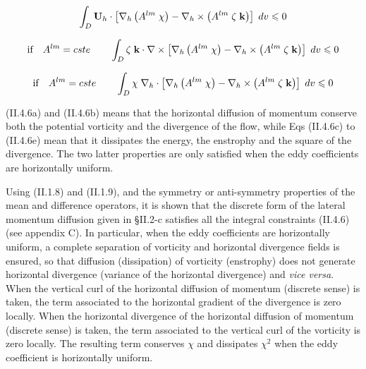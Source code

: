 \documentclass[NEMO_book]{subfiles}
\begin{document}
\begin{equation} \label{Eq_dynldf_curl}
\int_D {{\rm {\bf U}}_h \cdot \left[ {\nabla _h \left( {A^{lm}\;\chi } 
\right)-\nabla _h \times \left( {A^{lm}\;\zeta \;{\rm {\bf k}}} \right)} 
\right]\;dv} \leqslant 0
\end{equation}

\begin{equation} \label{Eq_dynldf_curl2}
\mbox{if}\quad A^{lm}=cste\quad \quad \int_D {\zeta \;{\rm {\bf k}}\cdot 
\nabla \times \left[ {\nabla _h \left( {A^{lm}\;\chi } \right)-\nabla _h 
\times \left( {A^{lm}\;\zeta \;{\rm {\bf k}}} \right)} \right]\;dv} 
\leqslant 0
\end{equation}

\begin{equation} \label{Eq_dynldf_div2}
\mbox{if}\quad A^{lm}=cste\quad \quad \int_D {\chi \;\nabla _h \cdot \left[ 
{\nabla _h \left( {A^{lm}\;\chi } \right)-\nabla _h \times \left( 
{A^{lm}\;\zeta \;{\rm {\bf k}}} \right)} \right]\;dv} \leqslant 0
\end{equation}


(II.4.6a) and (II.4.6b) means that the horizontal diffusion of momentum 
conserve both the potential vorticity and the divergence of the flow, while 
Eqs (II.4.6c) to (II.4.6e) mean that it dissipates the energy, the enstrophy 
and the square of the divergence. The two latter properties are only 
satisfied when the eddy coefficients are horizontally uniform.

Using (II.1.8) and (II.1.9), and the symmetry or anti-symmetry properties of 
the mean and difference operators, it is shown that the discrete form of the 
lateral momentum diffusion given in {\S}II.2-c satisfies all the integral 
constraints (II.4.6) (see appendix C). In particular, when the eddy 
coefficients are horizontally uniform, a complete separation of vorticity 
and horizontal divergence fields is ensured, so that diffusion (dissipation) 
of vorticity (enstrophy) does not generate horizontal divergence (variance 
of the horizontal divergence) and \textit{vice versa}. When the vertical curl of the horizontal 
diffusion of momentum (discrete sense) is taken, the term associated to the 
horizontal gradient of the divergence is zero locally. When the horizontal 
divergence of the horizontal diffusion of momentum (discrete sense) is 
taken, the term associated to the vertical curl of the vorticity is zero 
locally. The resulting term conserves $\chi$ and dissipates 
$\chi^2$ when the 
eddy coefficient is horizontally uniform.
\end{document}
